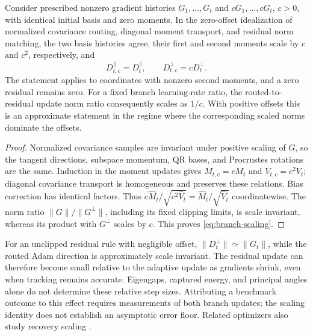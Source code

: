 \begin{proposition}
\label{prop:branch-scale}
Consider prescribed nonzero gradient histories $G_1,\ldots,G_t$ and
$cG_1,\ldots,cG_t$, $c>0$, with identical initial basis and zero moments.
In the zero-offset idealization of normalized covariance routing, diagonal
moment transport, and residual norm matching, the two basis histories agree,
their first and second moments scale by $c$ and $c^2$, respectively, and
\begin{equation}
 D_{t,c}^{\parallel}=D_t^{\parallel},\qquad
 D_{t,c}^{\perp}=cD_t^{\perp}.
 \label{eq:branch-scaling}
\end{equation}
The statement applies to coordinates with nonzero second moments, and a
zero residual remains zero. For a fixed branch learning-rate ratio, the
routed-to-residual update norm ratio consequently scales as $1/c$.
With positive offsets this is an approximate statement in the regime where
the corresponding scaled norms dominate the offsets.
\end{proposition}
\begin{proof}
Normalized covariance samples are invariant under positive scaling of $G$,
so the tangent directions, subspace momentum, QR bases, and Procrustes
rotations are the same. Induction in the moment updates gives
$M_{t,c}=cM_t$ and $V_{t,c}=c^2V_t$; diagonal covariance transport is
homogeneous and preserves these relations. Bias correction has identical
factors. Thus $c\widehat M_t/\sqrt{c^2\widehat V_t}
=\widehat M_t/\sqrt{\widehat V_t}$ coordinatewise.
The norm ratio $\|G\|/\|G^\perp\|$, including its fixed clipping limits,
is scale invariant, whereas its product with $G^\perp$ scales by $c$.
This proves \eqref{eq:branch-scaling}.
\end{proof}

For an unclipped residual rule with negligible offset,
$\|D_t^\perp\|\simeq\|G_t\|$, while the routed Adam direction is
approximately scale invariant. The residual update can therefore become
small relative to the adaptive update as gradients shrink, even when
tracking remains accurate. Eigengaps, captured energy, and principal
angles alone do not determine these relative step sizes. Attributing a
benchmark outcome to this effect requires measurements of both branch
updates; the scaling identity does not establish an asymptotic error floor.
Related optimizers also study recovery scaling
\cite{chen2024fira,rajabi2025subtrackpp}.

